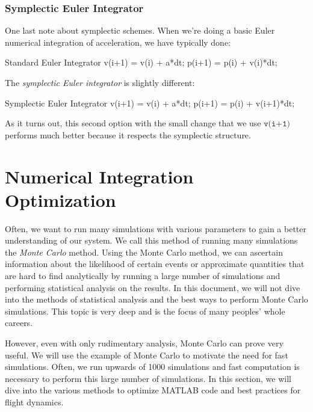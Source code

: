 \documentclass[10pt, openany, titlepage]{book}
\theoremstyle{definition}
\newcounter{example}[chapter]
\begin{document}
\subsubsection{Symplectic Euler Integrator}
One last note about symplectic schemes. When we're doing a basic Euler numerical integration of acceleration, we have typically done:
\begin{matlabscript}{Standard Euler Integrator}
v(i+1) = v(i) + a*dt;
p(i+1) = p(i) + v(i)*dt;
\end{matlabscript}

The \textit{symplectic Euler integrator} is slightly different:

\begin{matlabscript}{Symplectic Euler Integrator}
v(i+1) = v(i) + a*dt;
p(i+1) = p(i) + v(i+1)*dt;
\end{matlabscript}

As it turns out, this second option with the small change that we use $\texttt{v(i+1)}$ performs much better because it respects the symplectic structure.



\section{Numerical Integration Optimization}\label{sec: code optimization}

Often, we want to run many simulations with various parameters to gain a better understanding of our system. We call this method of running many simulations the \textit{Monte Carlo} method. Using the Monte Carlo method, we can ascertain information about the likelihood of certain events or approximate quantities that are hard to find analytically by running a large number of simulations and performing statistical analysis on the results. In this document, we will not dive into the methods of statistical analysis and the best ways to perform Monte Carlo simulations. This topic is very deep and is the focus of many peoples’ whole careers.

However, even with only rudimentary analysis, Monte Carlo can prove very useful. We will use the example of Monte Carlo to motivate the need for fast simulations. Often, we run upwards of 1000 simulations and fast computation is necessary to perform this large number of simulations. In this section, we will dive into the various methods to optimize MATLAB code and best practices for flight dynamics.
\end{document}
